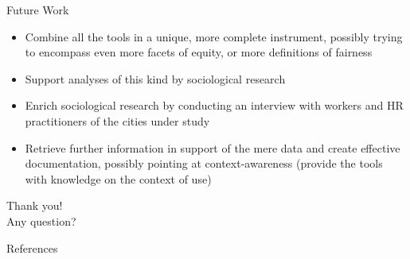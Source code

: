 \documentclass[usenames,dvipsnames]{beamer}
\begin{document}
    
    \begin{frame}{Future Work}
        \begin{itemize}
            \item Combine all the tools in a unique, more complete instrument, possibly trying to encompass even more facets of equity, or more definitions of fairness
            \item Support analyses of this kind by sociological research
            \item Enrich sociological research by conducting an interview with workers and HR practitioners of the cities under study
            \item Retrieve further information in support of the mere data and create effective documentation, possibly pointing at \textcolor{defaultBlue}{context-awareness} (provide the tools with knowledge on the context of use)
        \end{itemize}
    \end{frame}
    
    
    \begin{frame}
        \centering \huge Thank you!\\
        \vspace{\baselineskip}
        \centering \Large Any question?
    \end{frame}
    
    
    \begin{frame}{References}
        \printbibliography
    \end{frame}
\end{document}
